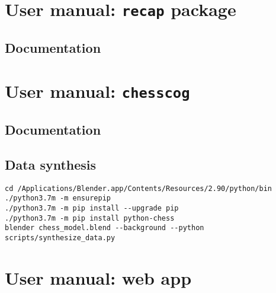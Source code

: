 \documentclass[../../report.tex]{subfiles}
\begin{document}
\chapter{User manual: \texttt{recap} package}
\label{chap:user_man_recap}

\section{Documentation}
\label{sec:recap_documentation}

\chapter{User manual: \texttt{chesscog}}
\label{chap:user_man_chesscog}

\section{Documentation}
\label{sec:chesscog_documentation}

\section{Data synthesis}
\label{sec:user_man_chesscog_data_synthesis}
\begin{verbatim}
cd /Applications/Blender.app/Contents/Resources/2.90/python/bin
./python3.7m -m ensurepip
./python3.7m -m pip install --upgrade pip
./python3.7m -m pip install python-chess
blender chess_model.blend --background --python scripts/synthesize_data.py
\end{verbatim}

\chapter{User manual: web app}
\label{chap:user_man_chesscogapp}
\end{document}
